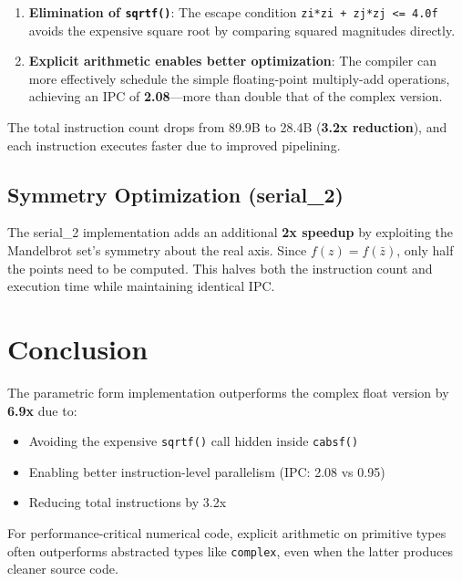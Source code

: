 \documentclass[11pt]{article}
\begin{document}
\begin{enumerate}
    \item \textbf{Elimination of \texttt{sqrtf()}}: The escape condition \texttt{zi*zi + zj*zj <= 4.0f} avoids the expensive square root by comparing squared magnitudes directly.
    
    \item \textbf{Explicit arithmetic enables better optimization}: The compiler can more effectively schedule the simple floating-point multiply-add operations, achieving an IPC of \textbf{2.08}---more than double that of the complex version.
\end{enumerate}

The total instruction count drops from 89.9B to 28.4B (\textbf{3.2x reduction}), and each instruction executes faster due to improved pipelining.

\subsection{Symmetry Optimization (serial\_2)}

The serial\_2 implementation adds an additional \textbf{2x speedup} by exploiting the Mandelbrot set's symmetry about the real axis. Since $f(z) = f(\bar{z})$, only half the points need to be computed. This halves both the instruction count and execution time while maintaining identical IPC.

\section{Conclusion}

The parametric form implementation outperforms the complex float version by \textbf{6.9x} due to:
\begin{itemize}
    \item Avoiding the expensive \texttt{sqrtf()} call hidden inside \texttt{cabsf()}
    \item Enabling better instruction-level parallelism (IPC: 2.08 vs 0.95)
    \item Reducing total instructions by 3.2x
\end{itemize}

For performance-critical numerical code, explicit arithmetic on primitive types often outperforms abstracted types like \texttt{complex}, even when the latter produces cleaner source code.
\end{document}

